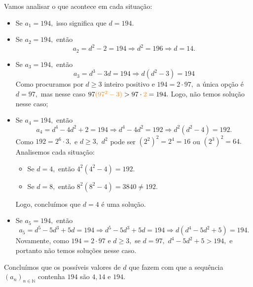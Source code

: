 \documentclass[12pt, a4paper]{article}
\begin{document}
\begin{solution}
Vamos analisar o que acontece em cada situação:
\begin{itemize}
    \item Se $a_1 = 194,$ isso significa que $d = 194.$
    \item Se $a_2 = 194,$ então \[a_2 = d^2 - 2 = 194 \Rightarrow d^2 = 196 \Rightarrow d = 14. \]
    \item Se $a_3 = 194,$ então \[a_3 = d^3 - 3d = 194 \Rightarrow d(d^2 - 3) = 194\] Como procuramos por $d \ge 3$ inteiro positivo e $194 = 2 \cdot 97,$ a única opção é $d = 97, $ mas nesse caso $97\textcolor{BurntOrange}{(97^2 - 3)} > 97 \cdot \textcolor{BurntOrange}{2} = 194.$ Logo, não temos solução nesse caso;
    \item Se $a_4 = 194,$ então
    \[
    a_4 = d^4 - 4d^2 + 2 = 194 \Rightarrow d^4 - 4d^2 = 192 \Rightarrow d^2(d^2 - 4) = 192.
    \]
    Como $192 = 2^6 \cdot 3,$ e $d \ge 3,$ $d^2$ pode ser $(2^2)^2 = 2^4 = 16$ ou $(2^3)^2 = 64.$ Analisemos cada situação:
    \begin{itemize}
        \item[\blacksmiley] Se $d = 4,$ então $4^2(4^2 - 4) = 192.$
        \item[\smiley] Se $d = 8,$ então $8^2(8^2 - 4) = 3840 \neq 192.$
    \end{itemize}
    Logo, concluímos que $d = 4$ é uma solução.
    \item Se $a_5 = 194,$ então
    \[
    a_5 = d^5 - 5d^3 + 5d  = 194 \Rightarrow d^5 - 5d^3 + 5d = 194 \Rightarrow d(d^4 - 5d^2 + 5) = 194.
    \]
    Novamente, como $194 = 2 \cdot 97$ e $d \ge 3,$ se $d = 97,$ $d^4 - 5d^2 + 5 > 194,$ e portanto não temos soluções nesse caso.
\end{itemize}
Concluímos que os possíveis valores de $d$ que fazem com que a sequência $(a_n)_{n \in \mathbb{N}}$ contenha $194$ são $4, 14$ e $194.$


\end{solution}
\end{document}
